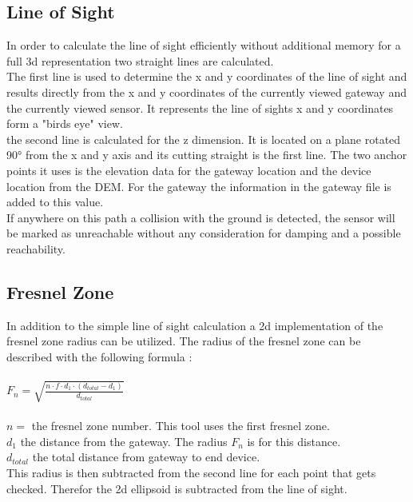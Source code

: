 \documentclass[12pt,a4paper]{article}
\begin{document}
\subsection{Line of Sight}
In order to calculate the line of sight efficiently without additional memory for a full 3d representation two straight lines are calculated.\\
The first line is used to determine the x and y coordinates of the line of sight and results directly from the x and y coordinates of the currently viewed gateway and the currently viewed sensor. It represents the line of sights x and y coordinates form a "birds eye" view.\\
the second line is calculated for the z dimension. It is located on a plane rotated 90° from the x and y axis and its cutting straight is the first line. The two anchor points it uses is the elevation data for the gateway location and the device location from the DEM. For the gateway the information in the gateway file is added to this value.\\
If anywhere on this path a collision with the ground is detected, the sensor will be marked as unreachable without any consideration for damping and a possible reachability.
\subsection{Fresnel Zone}
In addition to the simple line of sight calculation a 2d implementation of the fresnel zone radius can be utilized. The radius of the fresnel zone can be described with the following formula \cite{fresnelzone}:\\
\\
$F_n=\sqrt{\frac{n\cdot f \cdot d_1 \cdot(d_{total}-d_1)}{d_{total}}}$\\
\\
$n=$ the fresnel zone number. This tool uses the first fresnel zone.\\
$d_1$ the distance from the gateway. The radius $F_n$ is for this distance.\\
$d_{total}$ the total distance from gateway to end device.\\
This radius is then subtracted from the second line for each point that gets checked. Therefor the 2d ellipsoid is subtracted from the line of sight.
\end{document}
